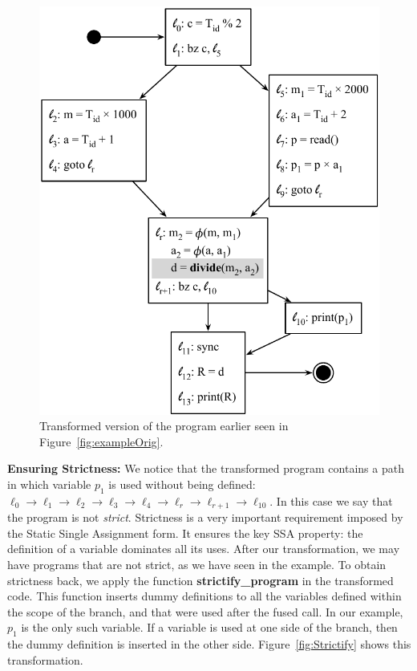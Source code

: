 \documentclass[times,10pt,twocolumn]{article}
\begin{document}
\begin{figure}[hbt]
\begin{center}
\includegraphics[width=1\columnwidth]{images/Algorithm1}
\end{center}
\caption{\label{fig:Algorithm1}
Transformed version of the program earlier seen in Figure~\ref{fig:exampleOrig}.}
\end{figure}

\noindent
\textbf{Ensuring Strictness: }
We notice that the transformed program contains a path in which variable $p_1$
is used without being defined: $\ell_0 \rightarrow \ell_1 \rightarrow \ell_2
\rightarrow \ell_3 \rightarrow \ell_4 \rightarrow \ell_r \rightarrow \ell_{r+1}
\rightarrow \ell_10$.
In this case we say that the program is not {\em strict}.
Strictness is a very important requirement imposed by the Static Single Assignment
form.
It ensures the key SSA property: the definition of a variable dominates all its
uses.
After our transformation, we may have programs that are not strict, as we have
seen in the example.
To obtain strictness back, we apply the function \textbf{strictify\_program} in
the transformed code.
This function inserts dummy definitions to all the variables defined within
the scope of the branch, and that were used after the fused call.
In our example, $p_1$ is the only such variable.
If a variable is used at one side of the branch, then the dummy definition
is inserted in the other side.
Figure~\ref{fig:Strictify} shows this transformation.
\end{document}
